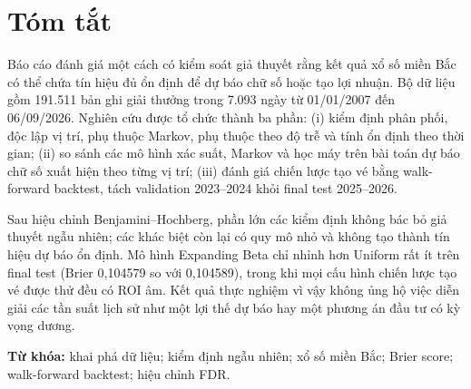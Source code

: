 \chapter*{Tóm tắt}

Báo cáo đánh giá một cách có kiểm soát giả thuyết rằng kết quả xổ số miền Bắc có thể chứa tín hiệu đủ ổn định để dự báo chữ số hoặc tạo lợi nhuận. Bộ dữ liệu gồm 191.511 bản ghi giải thưởng trong 7.093 ngày từ 01/01/2007 đến 06/09/2026. Nghiên cứu được tổ chức thành ba phần: (i) kiểm định phân phối, độc lập vị trí, phụ thuộc Markov, phụ thuộc theo độ trễ và tính ổn định theo thời gian; (ii) so sánh các mô hình xác suất, Markov và học máy trên bài toán dự báo chữ số xuất hiện theo từng vị trí; (iii) đánh giá chiến lược tạo vé bằng walk-forward backtest, tách validation 2023--2024 khỏi final test 2025--2026.

Sau hiệu chỉnh Benjamini--Hochberg, phần lớn các kiểm định không bác bỏ giả thuyết ngẫu nhiên; các khác biệt còn lại có quy mô nhỏ và không tạo thành tín hiệu dự báo ổn định. Mô hình Expanding Beta chỉ nhỉnh hơn Uniform rất ít trên final test (Brier 0,104579 so với 0,104589), trong khi mọi cấu hình chiến lược tạo vé được thử đều có ROI âm. Kết quả thực nghiệm vì vậy không ủng hộ việc diễn giải các tần suất lịch sử như một lợi thế dự báo hay một phương án đầu tư có kỳ vọng dương.

\noindent\textbf{Từ khóa:} khai phá dữ liệu; kiểm định ngẫu nhiên; xổ số miền Bắc; Brier score; walk-forward backtest; hiệu chỉnh FDR.
